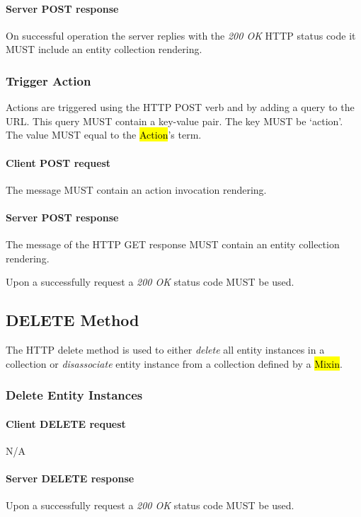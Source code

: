 \documentclass[10pt,a4paper]{article}
\begin{document}
\paragraph{Server POST response}
On successful operation the server replies with the \emph{200 OK} HTTP status code it MUST include an entity collection rendering.

\subsubsection{Trigger Action}
Actions are triggered using the HTTP POST verb and by adding a query to the URL. This query MUST contain a key-value pair. The key MUST be `action'. The value MUST equal to the \hl{Action}'s term.

\paragraph{Client POST request}
The message MUST contain an action invocation rendering.

\paragraph{Server POST response}
The message of the HTTP GET response MUST contain an entity collection rendering.

Upon a successfully request a \emph{200 OK} status code MUST be used.

\subsection{DELETE Method}
The HTTP delete method is used to either {\em delete} all entity instances in a collection or {\em disassociate} entity instance from a collection defined by a \hl{Mixin}.

\subsubsection{Delete Entity Instances}

\paragraph{Client DELETE request}
N/A

\paragraph{Server DELETE response}
Upon a successfully request a \emph{200 OK} status code MUST be used.
\end{document}
